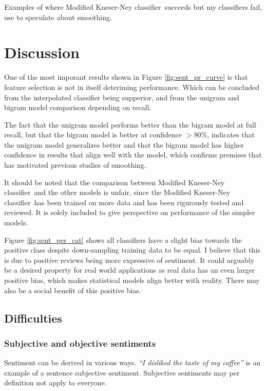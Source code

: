 \documentclass[a4paper,11pt]{kth-mag}
\newcommand{\ysc}{Modified Kneser-Ney classifier}
\begin{document}
Examples of where \ysc~succeeds but my classifiers fail, use to speculate about smoothing.


\newpage
\section{Discussion}

One of the most imporant results shown in Figure \ref{fig:sent_pr_curve} is that feature selection is not in itself deteriming performance.  Which can be concluded from the interpolated classifier being supperior, and from the unigram and bigram model comparison depending on recall.

The fact that the unigram model performs better than the bigram model at full recall, but that the bigram model is better at confidence $>80\%$, indicates that the unigram model generalizes better and that the bigram model has higher confidence in results that align well with the model, which confirms premises that has motivated previous studies of smoothing.

It should be noted that the comparison between \ysc~and the other models is unfair, since the \ysc~has been trained on more data and has been rigurously tested and reviewed. It is solely included to give perspective on performance of the simpler models.

Figure \ref{fig:sent_per_cat} shows all classifiers have a slight bias towards the positive class despite down-sampling training data to be equal. I believe that this is due to positive reviews being more expressive of sentiment. It could arguably be a desired property for real world applications as real data has an even larger positive bias, which makes statistical models align better with reality. There may also be a social benefit of this positive bias.





\subsection{Difficulties}
\subsubsection{Subjective and objective sentiments}
Sentiment can be derived in various ways. \emph{``I disliked the taste of my coffee''} is an example of a sentence subjective sentiment. Subjective sentiments may per definition not apply to everyone.
\end{document}
